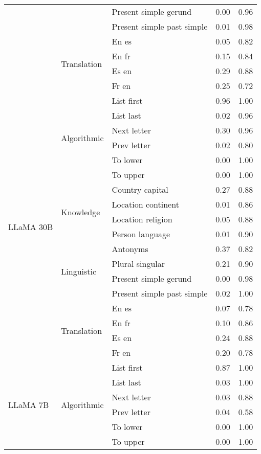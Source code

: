 \begin{center}
\begin{longtable}{lllrr}
 &  & Present simple gerund & 0.00 & 0.96 \\
 &  & Present simple past simple & 0.01 & 0.98 \\
\cline{2-5}
 & \multirow[t]{4}{*}{Translation} & En es & 0.05 & 0.82 \\
 &  & En fr & 0.15 & 0.84 \\
 &  & Es en & 0.29 & 0.88 \\
 &  & Fr en & 0.25 & 0.72 \\
\cline{1-5} \cline{2-5}
\multirow[t]{18}{*}{LLaMA 30B} & \multirow[t]{6}{*}{Algorithmic} & List first & 0.96 & 1.00 \\
 &  & List last & 0.02 & 0.96 \\
 &  & Next letter & 0.30 & 0.96 \\
 &  & Prev letter & 0.02 & 0.80 \\
 &  & To lower & 0.00 & 1.00 \\
 &  & To upper & 0.00 & 1.00 \\
\cline{2-5}
 & \multirow[t]{4}{*}{Knowledge} & Country capital & 0.27 & 0.88 \\
 &  & Location continent & 0.01 & 0.86 \\
 &  & Location religion & 0.05 & 0.88 \\
 &  & Person language & 0.01 & 0.90 \\
\cline{2-5}
 & \multirow[t]{4}{*}{Linguistic} & Antonyms & 0.37 & 0.82 \\
 &  & Plural singular & 0.21 & 0.90 \\
 &  & Present simple gerund & 0.00 & 0.98 \\
 &  & Present simple past simple & 0.02 & 1.00 \\
\cline{2-5}
 & \multirow[t]{4}{*}{Translation} & En es & 0.07 & 0.78 \\
 &  & En fr & 0.10 & 0.86 \\
 &  & Es en & 0.24 & 0.88 \\
 &  & Fr en & 0.20 & 0.78 \\
\cline{1-5} \cline{2-5}
\multirow[t]{18}{*}{LLaMA 7B} & \multirow[t]{6}{*}{Algorithmic} & List first & 0.87 & 1.00 \\
 &  & List last & 0.03 & 1.00 \\
 &  & Next letter & 0.03 & 0.88 \\
 &  & Prev letter & 0.04 & 0.58 \\
 &  & To lower & 0.00 & 1.00 \\
 &  & To upper & 0.00 & 1.00 \\
\cline{2-5}

\end{longtable}
\end{center}

